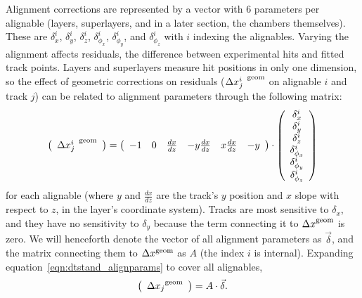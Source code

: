 Alignment corrections are represented by a vector with 6 parameters
per alignable (layers, superlayers, and in a later section, the
chambers themselves).  These are $\delta_x^i$, $\delta_y^i$,
$\delta_z^i$, $\delta_{\phi_x}^i$, $\delta_{\phi_y}^i$, and
$\delta_{\phi_z}^i$ with $i$ indexing the alignables.  Varying the
alignment affects residuals, the difference between experimental hits and fitted track
points.  Layers and superlayers measure hit positions in only one
dimension, so the effect of geometric corrections on residuals (${\Delta
x^i_j}^{\mbox{\scriptsize \, geom}}$ on alignable $i$ and track $j$) can
be related to alignment parameters through the following matrix:
\begin{equation}
\left(\begin{array}{c} 
{\Delta x^i_j}^{\mbox{\scriptsize \, geom}} \\
\end{array}\right) = 
\left(\begin{array}{c c c c c c}
-1 & 0 & \frac{dx}{dz} & -y\frac{dx}{dz} & x\frac{dx}{dz} & -y  \\
\end{array}\right)\cdot
\left(\begin{array}{c} 
\delta_x^i \\
\delta_y^i \\
\delta_z^i \\
\delta_{\phi_x}^i \\
\delta_{\phi_y}^i \\
\delta_{\phi_z}^i \\
\end{array}\right)
\label{eqn:dtstand_alignparams}
\end{equation}
for each alignable (where $y$ and $\frac{dx}{dz}$ are the track's $y$ position
and $x$ slope with respect to $z$, in the layer's coordinate system).
Tracks are most sensitive to $\delta_x$, and they have no sensitivity
to $\delta_y$ because the term connecting it to ${\Delta
x}^{\mbox{\scriptsize geom}}$ is zero.  We will henceforth denote the
vector of all alignment parameters as $\vec{\delta}$, and the matrix
connecting them to $\Delta x^{\mbox{\scriptsize geom}}$ as $A$ (the index $i$
is internal).  Expanding equation~\ref{eqn:dtstand_alignparams} to cover all alignables,
\begin{equation}
\left(\begin{array}{c} 
{\Delta x_j}^{\mbox{\scriptsize geom}} \\
\end{array}\right) = A \cdot \vec{\delta} \mbox{.}
\end{equation}

